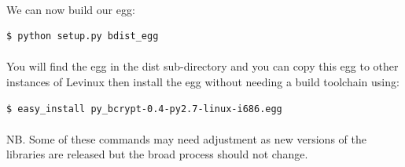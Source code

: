 \documentclass[12pt, a4paper, twoside]{book}
\begin{document}
\paragraph{} We can now build our egg:
\begin{lstlisting}[style=DOS]
    $ python setup.py bdist_egg
\end{lstlisting}

\paragraph{} You will find the egg in the dist sub-directory and you can copy this egg to other instances of Levinux then install the egg without needing a build toolchain using:
\begin{lstlisting}[style=DOS]
    $ easy_install py_bcrypt-0.4-py2.7-linux-i686.egg
\end{lstlisting}

\paragraph{} NB. Some of these commands may need adjustment as new versions of the libraries are released but the broad process should not change.







\backmatter




\end{document}
